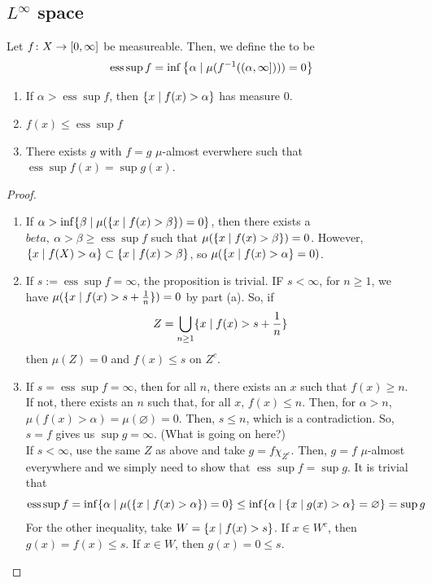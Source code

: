 \documentclass[11pt,leqno,oneside]{amsbook}
\numberwithin{thm}{section}
\newcommand{\ess}{\operatorname{ess}}
\renewcommand{\emptyset}{\varnothing}
\begin{document}
\subsection{\(L^\infty\) space}
\begin{defn}
  Let \(f \colon X \to [0,\infty]\) be measureable. Then, we define the
   to be \[
    \ess\sup f = \inf \left\{ \alpha \st \mu(f^{-1}((\alpha,\infty])))
      = 0 \right\}
  \]
\end{defn}
\begin{prop}
  \begin{enumerate}
  \item If \(\alpha > \ess\sup f\), then \(\{x \mid f(x) > \alpha\}\)
    has measure 0.
  \item \(f(x) \leq \ess \sup f\)
  \item There exists \(g\) with \(f = g\) \(\mu\)-almost everwhere
    such that \(\ess \sup f(x) = \sup g(x)\).
  \end{enumerate}
\end{prop}
\begin{proof}
  \begin{enumerate}
  \item If \(\alpha > \inf \{\beta \mid \mu(\{x \mid f(x) > \beta\}) =
    0\}\), then there exists a \(beta,\ \alpha > \beta \geq \ess\sup
    f\) such that \(\mu(\{x \mid f(x) > \beta\}) = 0\). However, \(\{x
    \mid f(X) > \alpha\} \subset \{x \mid f(x) > \beta\}\), so \(\mu(\{x
    \mid f(x) > \alpha\} = 0)\).
  \item If \(s := \ess \sup f = \infty\), the proposition is
    trivial. IF \(s < \infty\), for \(n \geq 1\), we have \(\mu(\{x
    \mid f(x) > s + \frac{1}{n}\}) = 0\) by part (a). So, if \[
      Z = \bigcup_{n \geq 1} \{x \mid f(x) > s + \frac{1}{n}\}
    \]
    then \(\mu(Z) = 0\) and \(f(x) \leq s\) on \(Z^c\).
  \item If \(s = \ess\sup f = \infty\), then for all \(n\), there
    exists an \(x\) such that \(f(x) \geq n\). If not, there exists an
    \(n\) such that, for all \(x\), \(f(x) \leq n\). Then, for
    \(\alpha > n\), \(\mu(f(x) > \alpha) = \mu(\emptyset) = 0\). Then,
    \(s \leq n\), which is a contradiction. So, \(s = f\) gives us
    \(\sup g = \infty\). (What is going on here?) \\

    If \(s < \infty\), use the same \(Z\) as above and take \(g = f
    \chi_{Z^c}\). Then, \(g = f\) \(\mu\)-almost everywhere and we
    simply need to show that \(\ess \sup f = \sup g\). It is trivial
    that \[
      \ess\sup f = \inf \{\alpha \st \mu(\{x \st f(x) > \alpha\}) = 0\} \leq \inf
      \{\alpha \st \{x \st g(x) > \alpha\} = \emptyset\} = \sup g
    \]
    For the other inequality, take \(W = \{x \mid f(x) > s\}\). If \(x
    \in W^c\), then \(g(x) = f(x) \leq s\). If \(x \in W\), then
    \(g(x) = 0 \leq s\).
  \end{enumerate}
\end{proof}
\end{document}
